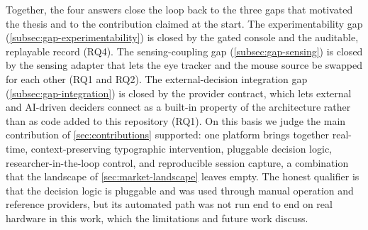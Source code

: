 Together, the four answers close the loop back to the three gaps that motivated the thesis and to the contribution claimed at the start.
The experimentability gap (\cref{subsec:gap-experimentability}) is closed by the gated console and the auditable, replayable record (RQ4).
The sensing-coupling gap (\cref{subsec:gap-sensing}) is closed by the sensing adapter that lets the eye tracker and the mouse source be swapped for each other (RQ1 and RQ2).
The external-decision integration gap (\cref{subsec:gap-integration}) is closed by the provider contract, which lets external and AI-driven deciders connect as a built-in property of the architecture rather than as code added to this repository (RQ1).
On this basis we judge the main contribution of \cref{sec:contributions} supported: one platform brings together real-time, context-preserving typographic intervention, pluggable decision logic, researcher-in-the-loop control, and reproducible session capture, a combination that the landscape of \cref{sec:market-landscape} leaves empty.
The honest qualifier is that the decision logic is pluggable and was used through manual operation and reference providers, but its automated path was not run end to end on real hardware in this work, which the limitations and future work discuss.
